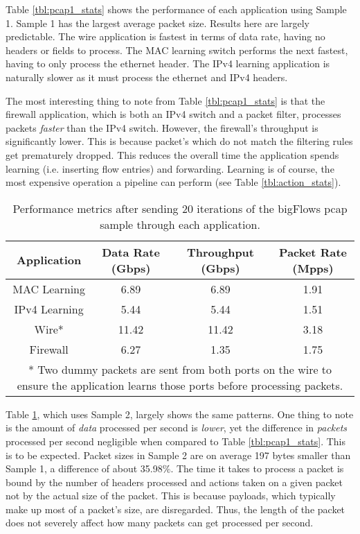 Table \ref{tbl:pcap1_stats} shows the performance of each application using Sample 1. Sample 1 has the largest average packet size. Results here are largely predictable. The wire application is fastest in terms of data rate, having no headers or fields to process. The MAC learning switch performs the next fastest, having to only process the ethernet header. The IPv4 learning application is naturally slower as it must process the ethernet and IPv4 headers.

The most interesting thing to note from Table \ref{tbl:pcap1_stats} is that the firewall application, which is both an IPv4 switch and a packet filter, processes packets \textit{faster} than the IPv4 switch. However, the firewall's throughput is significantly lower. This is because packet's which do not match the filtering rules get prematurely dropped. This reduces the overall time the application spends learning (i.e. inserting flow entries) and forwarding. Learning is of course, the most expensive operation a pipeline can perform (see Table \ref{tbl:action_stats}).

\begin{table}
\caption{Performance metrics after sending 20 iterations of the bigFlows pcap sample through each application.}
\begin{center}
\begin{tabularx}{0.9\textwidth}{| c || c | c | c | }
\hline
Application & Data Rate (Gbps) & Throughput (Gbps) & Packet Rate (Mpps)  \\
\hline
MAC Learning & 6.89 & 6.89 & 1.91  \\
\hline
IPv4 Learning & 5.44 & 5.44 & 1.51  \\
\hline 
Wire* & 11.42 & 11.42 & 3.18 \\
\hline
Firewall & 6.27 & 1.35 & 1.75 \\
\hline
\multicolumn{4}{p{0.9\textwidth}}{* Two dummy packets are sent from both ports on the wire to ensure the application learns those ports before processing packets.}
\end{tabularx}
\end{center}
\label{tbl:pcap2_stats}
\end{table}

Table \ref{tbl:pcap2_stats}, which uses Sample 2, largely shows the same patterns. One thing to note is the amount of \textit{data} processed per second is \textit{lower}, yet the difference in \textit{packets} processed per second negligible when compared to Table \ref{tbl:pcap1_stats}. This is to be expected. Packet sizes in Sample 2 are on average 197 bytes smaller than Sample 1, a difference of about 35.98\%. The time it takes to process a packet is bound by the number of headers processed and actions taken on a given packet not by the actual size of the packet. This is because payloads, which typically make up most of a packet's size, are disregarded. Thus, the length of the packet does not severely affect how many packets can get processed per second. 

